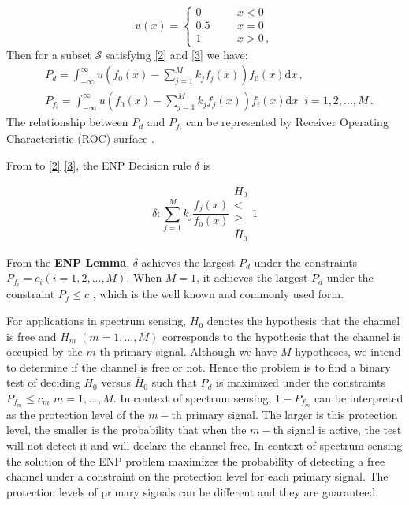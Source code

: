 \documentclass[12pt,journal,a4paper,twoside,onecolumn,draft]{IEEEtran}
\begin{document}
\begin{spacing}{2.5}
\begin{equation}
   \label{equ: step function}
   u(x) = \begin{cases}
     0\;\;\;\;\;\;&x < 0\\
     0.5\;\;\;\;\;\;&x=0\\
     1\;\;\;\;\;\;&x>0\,,
   \end{cases}
\end{equation}
Then for a subset $\mathcal{S}$ satisfying \eqref{2} and \eqref{3} we have:
\begin{equation}
\label{equ: pf and pd}
\begin{split}
&P_d = \int_{-\infty}^{\infty} u(f_0(x) - \sum_{j=1}^{M}k_jf_j(x)) f_0(x)\mathrm{d}x	\,, \\
&P_{f_i} = \int_{-\infty}^{\infty} u(f_0(x) - \sum_{j=1}^{M}k_jf_j(x)) f_i(x) \mathrm{d}x\;\;	 i=1, 2, ..., M\,.
\end{split}
\end{equation}
The relationship between $P_d$ and $P_{f_i}$ can be represented by Receiver Operating Characteristic (ROC) surface \cite{LehmannTest}.

From to \eqref{2} \eqref{3}, the ENP Decision rule $\delta$ is

\begin{equation}
\label{equ: decision rule}
\delta: \sum_{j=1}^{M}k_j\frac{f_j(x)}{f_0(x)} \substack{H_0 \\ < \\ \geq \\ \bar{H}_0} 1
\end{equation}

From the  \textbf{ENP Lemma}, $\delta$  achieves the largest $P_d$ under the constraints $P_{f_i} = c_i (i = 1, 2, ..., M)$.
When $M=1$, it achieves the largest $P_d$ under the constraint $P_f \leq c$ \cite{LehmannTest}, which is the well known and commonly used form.

For applications in spectrum sensing, $H_0$ denotes the hypothesis that the channel is free and $H_m \;(m=1, ..., M)$ corresponds to the hypothesis that the channel is occupied by the $m$-th primary signal. Although we have $M$ hypotheses, we intend to determine if the channel is free or not. Hence the problem is to find a binary test of deciding $H_0$ versus $\bar{H}_0$ such that $P_d$ is maximized under the constraints $P_{f_m} \leq c_m$ $m = 1, ..., M$. In context of spectrum sensing, $1-P_{f_m}$ can be interpreted as the protection level of the $m-$th primary signal. The larger is this protection level, the smaller is the probability that when the $m-$th signal is active, the test will not detect it and will declare the channel free. In context of spectrum sensing the solution of the ENP problem maximizes the probability of detecting a free channel under a constraint on the protection level for each primary signal. The protection levels of primary signals can be different and they are guaranteed.


\end{spacing}
\end{document}
